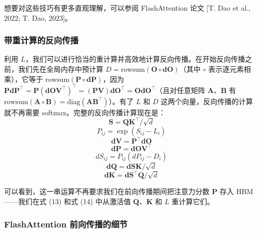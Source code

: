 想要对这些技巧有更多直观理解，可以参阅 FlashAttention 论文 [T. Dao et al., 2022; T. Dao, 2023]。

\subsubsection*{带重计算的反向传播}

利用 $L$，我们可以进行恰当的重计算并高效地计算反向传播。在开始反向传播之前，我们先在全局内存中预计算 $D = \mathrm{rowsum}(\boldsymbol{O} \circ \boldsymbol{dO})$（其中 $\circ$ 表示逐元素相乘），它等于 $\mathrm{rowsum}(\boldsymbol{P} \circ \boldsymbol{dP})$，因为 $\boldsymbol{P}\boldsymbol{dP}^{\top} = \boldsymbol{P}(\boldsymbol{dO}\boldsymbol{V}^{\top})^{\top} = (\boldsymbol{P}\boldsymbol{V})\boldsymbol{dO}^{\top} = \boldsymbol{O}\boldsymbol{dO}^{\top}$（且对任意矩阵 $\boldsymbol{A}$、$\boldsymbol{B}$ 有 $\mathrm{rowsum}(\boldsymbol{A} \circ \boldsymbol{B}) = \mathrm{diag}(\boldsymbol{A}\boldsymbol{B}^{\top})$）。有了 $L$ 和 $D$ 这两个向量，反向传播的计算就不再需要 softmax。完整的反向传播计算现在是：
\begin{equation}
\boldsymbol{S} = \boldsymbol{Q}\boldsymbol{K}^{\top} / \sqrt{d}
\end{equation}
\begin{equation}
P_{ij} = \exp(S_{ij} - L_i)
\end{equation}
\begin{equation}
\boldsymbol{dV} = \boldsymbol{P}^{\top} \boldsymbol{dO}
\end{equation}
\begin{equation}
\boldsymbol{dP} = \boldsymbol{dO}\boldsymbol{V}^{\top}
\end{equation}
\begin{equation}
dS_{ij} = P_{ij}\left(dP_{ij} - D_i\right)
\end{equation}
\begin{equation}
\boldsymbol{dQ} = \boldsymbol{dS}\boldsymbol{K} / \sqrt{d}
\end{equation}
\begin{equation}
\boldsymbol{dK} = \boldsymbol{dS}^{\top} \boldsymbol{Q} / \sqrt{d}
\end{equation}

可以看到，这一串运算不再要求我们在前向传播期间把注意力分数 $\boldsymbol{P}$ 存入 HBM——我们在式 (13) 和式 (14) 中从激活值 $\boldsymbol{Q}$、$\boldsymbol{K}$ 和 $L$ 重计算它们。

\subsubsection*{FlashAttention 前向传播的细节}

